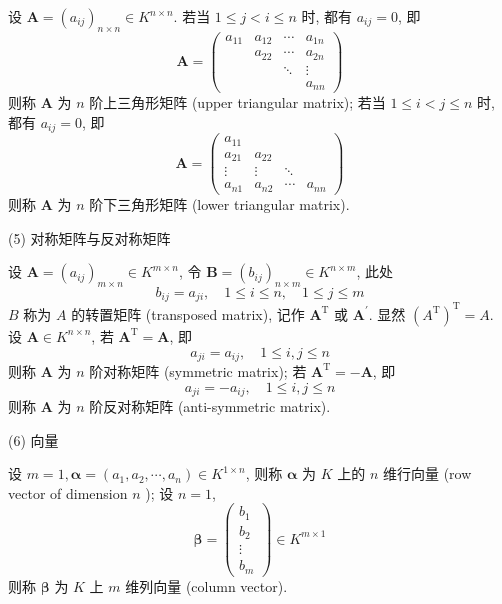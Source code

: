 \documentclass{article}
\begin{document}
设 $\boldsymbol{A}=\left(a_{i j}\right)_{n \times n} \in K^{n \times n}$. 若当 $1 \leq j<i \leq n$ 时, 都有 $a_{i j}=0$, 即
$$
\boldsymbol{A}=\left(\begin{array}{cccc}
	a_{11} & a_{12} & \cdots & a_{1 n} \\
	& a_{22} & \cdots & a_{2 n} \\
	& & \ddots & \vdots \\
	& & & a_{n n}
\end{array}\right)
$$
则称 $\boldsymbol{A}$ 为 $n$ 阶上三角形矩阵 (upper triangular matrix); 若当 $1 \leq i<j \leq n$ 时, 都有 $a_{i j}=0$, 即
$$
\boldsymbol{A}=\left(\begin{array}{cccc}
	a_{11} & & & \\
	a_{21} & a_{22} & & \\
	\vdots & \vdots & \ddots & \\
	a_{n 1} & a_{n 2} & \cdots & a_{n n}
\end{array}\right)
$$
则称 $\boldsymbol{A}$ 为 $n$ 阶下三角形矩阵 (lower triangular matrix).

(5) 对称矩阵与反对称矩阵

设 $\boldsymbol{A}=\left(a_{i j}\right)_{m \times n} \in K^{m \times n}$, 令 $\boldsymbol{B}=\left(b_{i j}\right)_{n \times m} \in K^{n \times m}$, 此处
$$
b_{i j}=a_{j i}, \quad 1 \leq i \leq n, \quad 1 \leq j \leq m
$$
$B$ 称为 $A$ 的转置矩阵 (transposed matrix), 记作 $\boldsymbol{A}^{\mathrm{T}}$ 或 $\boldsymbol{A}^{\prime}$.
显然 $\left(A^{\mathrm{T}}\right)^{\mathrm{T}}=A$.
设 $\boldsymbol{A} \in K^{n \times n}$, 若 $\boldsymbol{A}^{\mathrm{T}}=\boldsymbol{A}$, 即
$$
a_{j i}=a_{i j}, \quad 1 \leq i, j \leq n
$$
则称 $\boldsymbol{A}$ 为 $n$ 阶对称矩阵 (symmetric matrix); 若 $\boldsymbol{A}^{\mathrm{T}}=-\boldsymbol{A}$, 即
$$
a_{j i}=-a_{i j}, \quad 1 \leq i, j \leq n
$$
则称 $\boldsymbol{A}$ 为 $n$ 阶反对称矩阵 (anti-symmetric matrix).

(6) 向量

设 $m=1, \boldsymbol{\alpha}=\left(a_{1}, a_{2}, \cdots, a_{n}\right) \in K^{1 \times n}$, 则称 $\boldsymbol{\alpha}$ 为 $K$ 上的 $n$ 维行向量 (row vector of dimension $n$ ); 设 $n=1$,
$$
\boldsymbol{\beta}=\left(\begin{array}{c}
	b_{1} \\
	b_{2} \\
	\vdots \\
	b_{m}
\end{array}\right) \in K^{m \times 1}
$$
则称 $\boldsymbol{\beta}$ 为 $K$ 上 $m$ 维列向量 (column vector).
\end{document}
